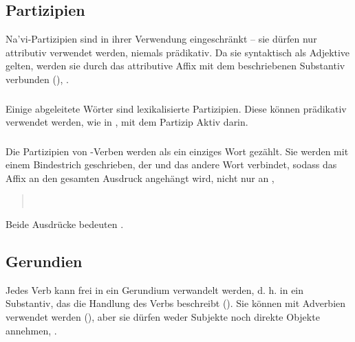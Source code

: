 \subsection{Partizipien} 
Na'vi-Partizipien sind in ihrer Verwendung eingeschränkt -- sie dürfen nur attributiv verwendet werden, niemals prädikativ. Da sie syntaktisch als Adjektive gelten, werden sie durch das attributive Affix  mit dem beschriebenen Substantiv verbunden (),  .\label{syn:part:attr}

\subsubsection{} Einige abgeleitete Wörter sind lexikalisierte Partizipien. Diese  können prädikativ verwendet werden, wie in  , mit dem Partizip Aktiv  darin.

\subsubsection{} Die Partizipien von -Verben werden als ein einziges Wort gezählt. Sie werden mit einem Bindestrich geschrieben, der  und das andere Wort verbindet, sodass das Affix  an den gesamten Ausdruck angehängt wird, nicht nur an , \label{syn:participle:si-const}

\begin{quotation}
	\noindent{}\\
	\noindent{}
\end{quotation}

\noindent Beide Ausdrücke bedeuten .

\subsection{Gerundien} Jedes Verb kann frei in ein Gerundium verwandelt werden, d. h. in ein Substantiv, das die Handlung des Verbs beschreibt (). Sie können mit Adverbien verwendet werden (), aber sie dürfen weder Subjekte noch direkte Objekte annehmen,  .\label{syn:gerund}

